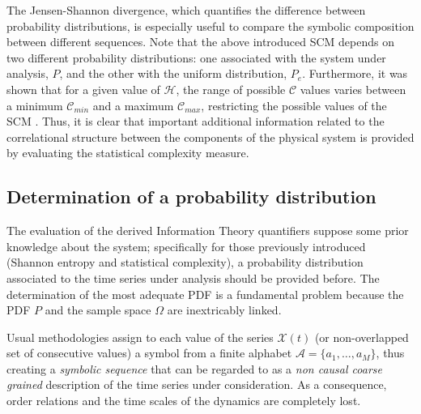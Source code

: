 The Jensen-Shannon divergence, which quantifies the difference between probability distributions, is especially useful to compare the symbolic composition between different sequences\cite{JS-Div1991,Grosse2002,JS-Div2014}.
Note that the above introduced SCM depends on two different probability distributions: one associated with the system under analysis, $P$, and the other with the uniform distribution, $P_e$.
Furthermore, it was shown that for a given value of ${\mathcal H}$, the range of possible ${\mathcal C}$ values varies between a minimum ${\mathcal C}_{min}$ and a maximum ${\mathcal C}_{max}$, restricting the possible values of the SCM \cite{Martin2006}.
Thus, it is clear that important additional information related to the correlational structure between the components of the physical system is provided by evaluating the statistical complexity measure. 

\subsection{Determination of a probability distribution}

The evaluation of the derived Information Theory quantifiers suppose some prior knowledge about the system; specifically for those previously introduced (Shannon entropy and statistical complexity), a probability distribution associated to the time series under analysis should be provided before.
The determination of the most adequate PDF is a fundamental problem because the PDF $P$ and the sample space $\Omega$ are inextricably linked. 

Usual methodologies assign to each value of the series ${\mathcal X}(t)$ (or non-overlapped set of consecutive values) a symbol from a finite alphabet $\mathcal{A}=\{a_1,\dots,a_M\}$, thus creating a {\it symbolic sequence} that can be regarded to as a {\it non causal coarse grained\/} description of the time series under consideration. 
As a consequence, order relations and the time scales of the dynamics are completely lost. 

